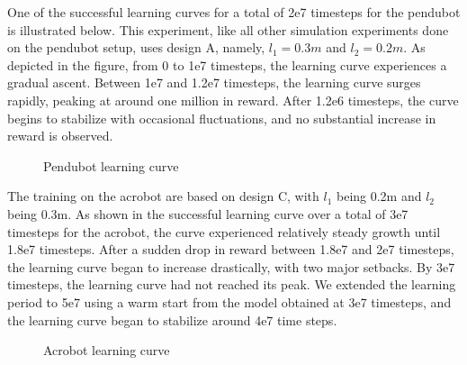 One of the successful learning curves for a total of 2e7 timesteps for the pendubot is illustrated below. This experiment, like all other simulation experiments done on the pendubot setup, uses design A, namely, $l_1 = 0.3m$ and $l_2 = 0.2m$. As depicted in the figure, from 0 to 1e7 timesteps, the learning curve experiences a gradual ascent. Between 1e7 and 1.2e7 timesteps, the learning curve surges rapidly, peaking at around one million in reward. After 1.2e6 timesteps, the curve begins to stabilize with occasional fluctuations, and no substantial increase in reward is observed.

\begin{figure}[H]
    \centering
    \caption{Pendubot learning curve}
    \label{fig:image_a}
\end{figure}

The training on the acrobot are based on design C, with $l_1$ being 0.2m and $l_2$ being 0.3m. As shown in the successful learning curve over a total of 3e7 timesteps for the acrobot, the curve experienced relatively steady growth until 1.8e7 timesteps. After a sudden drop in reward between 1.8e7 and 2e7 timesteps, the learning curve began to increase drastically, with two major setbacks. By 3e7 timesteps, the learning curve had not reached its peak. We extended the learning period to 5e7 using a warm start from the model obtained at 3e7 timesteps, and the learning curve began to stabilize around 4e7 time steps.

\begin{figure}[H]
    \centering
    \caption{Acrobot learning curve}
    \label{fig:image_b}
\end{figure}

